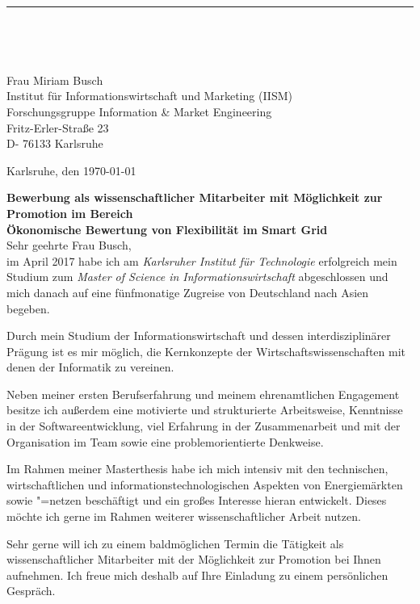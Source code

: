 \documentclass[sans,11pt,a4paper]{moderncv}
\makeatletter
\renewcommand*{\makecvtitle}{%
  \recomputecvlengths%
  \makecvfooter%
  \newbox{\makecvtitlepicturebox}%
  \savebox{\makecvtitlepicturebox}{%
    \ifthenelse{\isundefined{\@photo}}%
      {
        \@initializelength{\makecvtitlepicturewidth}%
        \settowidth{\makecvtitlepicturewidth}{0pt}%
      }%
      {%
       \setlength\fboxrule{\@photoframewidth}%
       \ifdim\@photoframewidth=0pt%
         \setlength{\fboxsep}{0pt}\fi%
       {\color{color1}\framebox{\texttt{[image: \\@photo]}}}}
        \@initializelength{\makecvtitlepicturewidth}%
        \settowidth{\makecvtitlepicturewidth}{\usebox{\makecvtitlepicturebox}}%
      }%

 {   \raggedright\namefont{\color{color2}\MakeLowercase{\@firstname}}\color{color1}\MakeLowercase{\@familyname}}%
    \hfill\usebox{\makecvtitlepicturebox}%
\\[-.35em]%
  {\color{color2}\rule{\textwidth}{.25ex}}%
  \ifthenelse{\equal{\@title}{}}{}{\\[1.25em]\null\hfill\titlestyle{\@title}}\\[0.0em]%
  \ifthenelse{\isundefined{\@quote}}%
    {}%
    {{\null\hfill\begin{minipage}{\quotewidth}\centering\quotestyle{\@quote}\end{minipage}\hfill\null\\[2.5em]}}%
  \par}%
\makeatother
\begin{document}
\vspace*{2.10cm}
\makecvtitle
\linespread {0.9}
Frau Miriam Busch\\
Institut für Informationswirtschaft und Marketing (IISM)\\
Forschungsgruppe Information \& Market Engineering \\
Fritz-Erler-Straße 23\\
D- 76133 Karlsruhe \\

\linespread {1.175}
\vspace*{1.5cm}

\begin{flushright}
	Karlsruhe, den \today
\end{flushright}

\textbf{Bewerbung als wissenschaftlicher Mitarbeiter mit Möglichkeit zur Promotion im Bereich\\ \glqq Ökonomische
	Bewertung von Flexibilität im Smart Grid\grqq} \\

Sehr geehrte Frau Busch,\\


im April 2017 habe ich am \textit{Karlsruher Institut für Technologie} erfolgreich mein Studium zum \textit{Master of Science in Informationswirtschaft} abgeschlossen und mich danach auf eine fünfmonatige Zugreise von Deutschland nach Asien begeben.

Durch mein Studium der Informationswirtschaft und dessen interdisziplinärer Prägung ist es mir möglich, die Kernkonzepte der Wirtschaftswissenschaften mit denen der Informatik zu vereinen.


Neben meiner ersten Berufserfahrung und meinem ehrenamtlichen Engagement besitze ich außerdem eine motivierte und strukturierte Arbeitsweise, Kenntnisse in der Softwareentwicklung, viel Erfahrung in der Zusammenarbeit und mit der Organisation im Team sowie eine problemorientierte Denkweise.

Im Rahmen meiner Masterthesis habe ich mich intensiv mit den technischen, wirtschaftlichen und informationstechnologischen Aspekten von Energiemärkten sowie "=netzen beschäftigt und ein großes Interesse hieran entwickelt. Dieses möchte ich gerne im Rahmen weiterer wissenschaftlicher Arbeit nutzen.

Sehr gerne will ich zu einem baldmöglichen Termin die Tätigkeit als wissenschaftlicher Mitarbeiter mit der Möglichkeit zur Promotion bei Ihnen aufnehmen. Ich freue mich deshalb auf Ihre Einladung zu einem persönlichen Gespräch.\\\\
\end{document}
